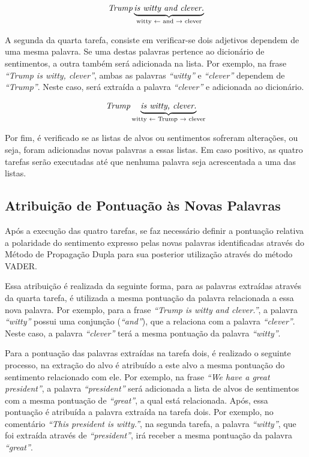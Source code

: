 \[\textit{Trump} \underbrace{\textit{is witty and clever.}}_\text{witty
\textleftarrow \text{ and} \textrightarrow \text{ clever}}\]


A segunda da quarta tarefa, consiste em verificar-se dois adjetivos
dependem de uma mesma palavra. Se uma destas palavras pertence ao dicionário de
sentimentos, a outra também será adicionada na lista. Por exemplo, na frase
\textit{``Trump is witty, clever''}, ambas as palavras \textit{``witty''} e
\textit{``clever''} dependem de \textit{``Trump''}. Neste caso, será extraída a
palavra \textit{``clever''} e adicionada ao dicionário.

\[\textit{Trump} \underbrace{\textit{is witty, clever.}}_\text{witty
\textleftarrow \text{ Trump} \textrightarrow \text{ clever}}\]

Por fim, é verificado se as listas de alvos ou sentimentos sofreram
alterações, ou seja, foram adicionadas novas palavras a essas listas. Em caso
positivo, as quatro tarefas serão executadas até que nenhuma palavra seja acrescentada a uma das listas.

\subsection{Atribuição de Pontuação às Novas Palavras}

Após a execução das quatro tarefas, se faz necessário definir a
pontuação relativa a polaridade do sentimento expresso pelas novas palavras
identificadas através do Método de Propagação Dupla para sua posterior
utilização através do método \ac{VADER}.

Essa atribuição é realizada da seguinte forma, para as palavras extraídas
através da quarta tarefa, é utilizada a mesma pontuação da palavra relacionada a
essa nova palavra. Por exemplo, para a frase \textit{``Trump is
witty and clever.''}, a palavra \textit{``witty''} possui uma conjunção
(\textit{``and''}), que a relaciona com a palavra \textit{``clever''}. Neste
caso, a palavra \textit{``clever''} terá a mesma pontuação da palavra
\textit{``witty''}.

Para a pontuação das palavras extraídas na tarefa dois, é realizado o seguinte
processo, na extração do alvo é atribuído a este alvo a mesma pontuação do
sentimento relacionado com ele. Por exemplo, na frase \textit{``We have a great
president''}, a palavra \textit{``president''} será adicionada a lista de alvos
de sentimentos com a mesma pontuação de \textit{``great''}, a qual está
relacionada. Após, essa pontuação é atribuída a palavra extraída na tarefa dois.
Por exemplo, no comentário \textit{``This president is witty.''}, na segunda
tarefa, a palavra \textit{``witty''}, que foi extraída através de
\textit{``president''}, irá receber a mesma pontuação da palavra \textit{``great''}.



